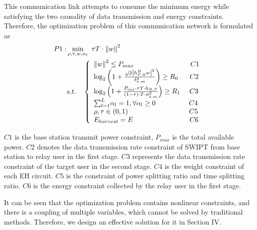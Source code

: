 \documentclass[conference]{IEEEtran}
\begin{document}
This communication link attempts to consume the minimum energy while satisfying the two causality of data transmission and energy constraints. Therefore, the optimization problem of this communication network is formulated as 
\begin{equation*}
\begin{split}
P1:&\min_{\rho , \tau , w , \alpha_{l}} \,\, \tau T\cdot \left \| w \right \|^{2}\\
&s.t.\quad  \left\{\begin{array}{lc}
\left \| w \right \| ^{2} \le P_{max} \qquad \qquad \qquad \qquad \, \notag{C1}\\
\log_{2}\left ( 1+\frac{\sqrt{\rho }\left |h_{P,R}^{H}w   \right |^{2}   }{\delta _{a,m}^{2} }  \right )\ge R_{0} \ \ \quad \notag{C2}\\
\log_{2}\left ( 1+\frac{P_{out}\cdot \tau T\cdot h_{R,P}  }{\left ( 1-\tau   \right ) \cdot T\cdot \sigma _{b,m}^{2}}  \right ) \ge R_{1} \ \quad \notag{C3}\\
{\textstyle \sum_{l=1}^{L}}\alpha _{l}= 1,\forall \alpha _{l}\ge 0 \qquad \qquad \ \ \, \notag{C4}\\
\rho ,\tau \in \left ( 0,1 \right ) \qquad \qquad \qquad \qquad \ \ \notag{C5}\\
E_{harvest}= E \qquad \qquad \qquad \qquad \, \notag{C6}\\
\end{array}\right.
\end{split}
\end{equation*}


$C1$ is the base station transmit power constraint, $P_{max}$ is the total available power. 
$C2$ denotes the data transmission rate constraint of SWIPT from base station to relay user in the first stage. 
$C3$ represents the data transmission rate constraint of the target user in the second stage.
$C4$ is the weight constraint of each EH circuit. 
$C5$ is the constraint of power splitting ratio and time splitting ratio.
$C6$ is  the energy constraint collected by the relay user in the first stage.

It can be seen that the optimization problem contains nonlinear constraints, and there is a coupling of multiple variables, which cannot be solved by traditional methods. Therefore, we design an effective solution for it in Section IV.
\end{document}
